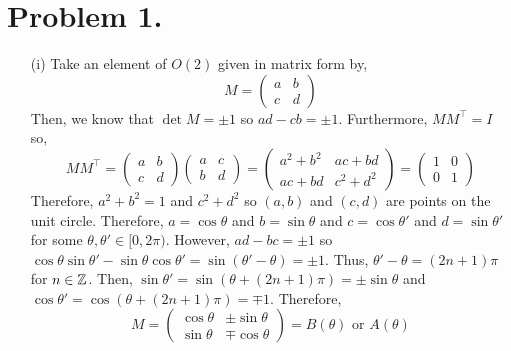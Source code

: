 \documentclass[12pt]{extarticle}
\begin{document}

\section*{Problem 1.}

\begin{enumerate}
\item[(i)]
Take an element of $O(2)$ given in matrix form by,
\[ M =  
\begin{pmatrix}
a & b\\
c & d
\end{pmatrix}\]
Then, we know that $\det{M} = \pm 1$ so $ad - cb = \pm 1$. Furthermore, $MM^\top = I$ so, 
\[ MM^\top =  
\begin{pmatrix}
a & b\\
c & d
\end{pmatrix}
\begin{pmatrix}
a & c\\
b & d
\end{pmatrix}
=
\begin{pmatrix}
a^2 + b^2 & ac + bd \\
ac + bd & c^2 + d^2
\end{pmatrix}
=
\begin{pmatrix}
1 & 0 \\
0 & 1
\end{pmatrix}
\]
Therefore, $a^2 + b^2 = 1$ and $c^2 + d^2$ so $(a, b)$ and $(c, d)$ are points on the unit circle. Therefore, $a = \cos{\theta}$ and $b = \sin{\theta}$ and $c = \cos{\theta'}$ and $d = \sin{\theta'}$  for some $\theta, \theta' \in [0, 2 \pi)$. However, $a d - bc = \pm 1$ so $\cos{\theta} \sin{\theta'} - \sin{\theta} \cos{\theta'} = \sin{(\theta' - \theta)} = \pm 1$. Thus, $\theta' - \theta = (2n + 1) \pi$ for $n \in \mathbb{Z}$. Then, $\sin{\theta'} = \sin{(\theta + (2n + 1) \pi)} = \pm \sin{\theta}$ and $\cos{\theta'} = \cos{(\theta + (2n + 1) \pi)} = \mp 1$. Therefore,
\[ M =  
\begin{pmatrix}
\cos{\theta} & \pm \sin{\theta}\\
\sin{\theta} & \mp \cos{\theta}
\end{pmatrix} 
= B(\theta) \text{ or } A(\theta) \]


\end{enumerate}
\end{document}

